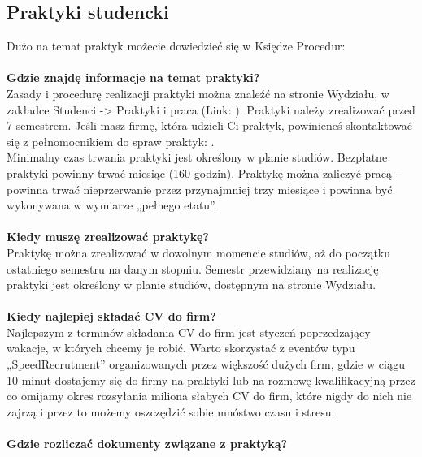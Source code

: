 \documentclass[11pt]{article}
\begin{document}
\subsection{Praktyki studencki}
\indent Dużo na temat praktyk możecie dowiedzieć się w Księdze Procedur: 
{} \\\\
\textbf{Gdzie znajdę informacje na temat praktyki?} \\
\indent Zasady i procedurę realizacji praktyki można znaleźć na stronie Wydziału, w zakładce Studenci -> Praktyki i praca (Link: 
{}).
Praktyki należy zrealizować przed 7 semestrem. Jeśli masz firmę, która udzieli Ci praktyk, powinieneś skontaktować się z pełnomocnikiem do spraw praktyk: 
{}. \\
\indent Minimalny czas trwania praktyki jest określony w planie studiów. Bezpłatne praktyki powinny trwać miesiąc (160 godzin). Praktykę można zaliczyć pracą – powinna trwać nieprzerwanie przez przynajmniej trzy miesiące i powinna być wykonywana w wymiarze „pełnego etatu”. \\\\
\textbf{Kiedy muszę zrealizować praktykę?} \\
\indent Praktykę można zrealizować w dowolnym momencie studiów, aż do początku ostatniego semestru na danym stopniu. Semestr przewidziany na realizację praktyki jest określony w planie studiów, dostępnym na stronie Wydziału. \\\\
\textbf{Kiedy najlepiej składać CV do firm?} \\
\indent Najlepszym z terminów składania CV do firm jest styczeń poprzedzający wakacje, w których chcemy je robić. Warto skorzystać z eventów typu „SpeedRecrutment” organizowanych przez większość dużych firm, gdzie w ciągu 10 minut dostajemy się do firmy na praktyki lub na rozmowę kwalifikacyjną przez co omijamy okres rozsyłania miliona słabych CV do firm, które nigdy do nich nie zajrzą i przez to możemy oszczędzić sobie mnóstwo czasu i stresu. \\\\
\textbf{Gdzie rozliczać dokumenty związane z praktyką?} \\
\end{document}
